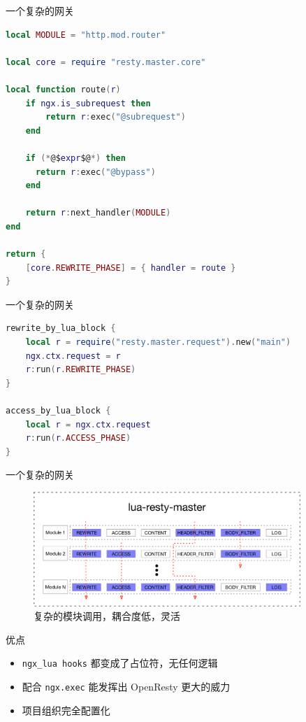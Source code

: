 \documentclass[aspectratio=32]{beamer}
\begin{document}
\begin{frame}[fragile]{一个复杂的网关}
\scriptsize
\begin{lstlisting}[language=lua]
local MODULE = "http.mod.router"

local core = require "resty.master.core"

local function route(r)
    if ngx.is_subrequest then
        return r:exec("@subrequest")
    end

    if (*@$expr$@*) then
      return r:exec("@bypass")
    end

    return r:next_handler(MODULE)
end

return {
    [core.REWRITE_PHASE] = { handler = route }
}
\end{lstlisting}
\end{frame}

\begin{frame}[fragile]{一个复杂的网关}
\scriptsize
\begin{lstlisting}[language=lua]
rewrite_by_lua_block {
    local r = require("resty.master.request").new("main")
    ngx.ctx.request = r
    r:run(r.REWRITE_PHASE)
}

access_by_lua_block {
    local r = ngx.ctx.request
    r:run(r.ACCESS_PHASE)
}
\end{lstlisting}
\end{frame}

\begin{frame}[fragile]{一个复杂的网关}
\begin{center}
  \begin{figure}[htlp]
    \includegraphics[width=0.9\textwidth]{complex_good.png}
    \caption{复杂的模块调用，耦合度低，灵活}
  \end{figure}
\end{center}
\end{frame}

\begin{frame}{优点}
\begin{itemize}
  \item \lstinline|ngx_lua hooks| 都变成了占位符，无任何逻辑
  \item 配合 \lstinline|ngx.exec| 能发挥出 OpenResty 更大的威力
  \item 项目组织完全配置化
\end{itemize}
\end{frame}
\end{document}
